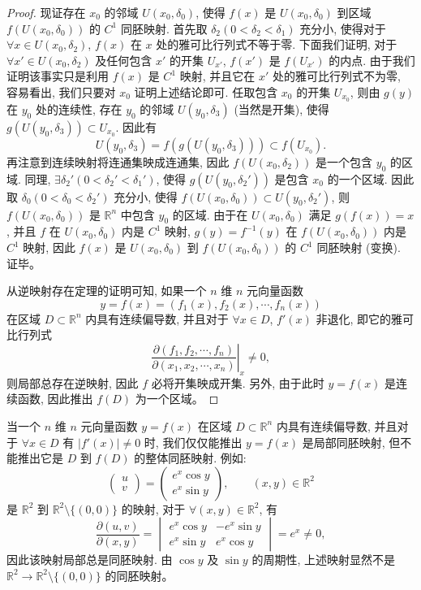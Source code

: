 \documentclass[12pt,fontset=fandol]{ctexart}
\begin{document}
\begin{proof}
现证存在 $x_0$ 的邻域 $U(x_0,\delta_0)$, 使得 $f(x)$ 是 $U(x_0,\delta_0)$ 到区域 $f(U(x_0,\delta_0))$ 的 $C^1$ 同胚映射. 首先取 $\delta_2(0<\delta_2<\delta_1)$ 充分小, 使得对于 $\forall x\in U(x_0,\delta_2)$, $f(x)$ 在 $x$ 处的雅可比行列式不等于零. 下面我们证明, 对于 $\forall x'\in U(x_0,\delta_2)$ 及任何包含 $x'$ 的开集 $U_{x'}$, $f(x')$ 是 $f(U_{x'})$ 的内点. 由于我们证明该事实只是利用 $f(x)$ 是 $C^1$ 映射, 并且它在 $x'$ 处的雅可比行列式不为零, 容易看出, 我们只要对 $x_0$ 证明上述结论即可. 任取包含 $x_0$ 的开集 $U_{x_0}$, 则由 $g(y)$ 在 $y_0$ 处的连续性, 存在 $y_0$ 的邻域 $U(y_0,\delta_3)$ (当然是开集), 使得 $g(U(y_0,\delta_3))\subset U_{x_0}$. 因此有
\[
  U(y_0,\delta_3)=f(g(U(y_0,\delta_3)))\subset f(U_{x_0}).
\]
再注意到连续映射将连通集映成连通集, 因此 $f(U(x_0,\delta_2))$ 是一个包含 $y_0$ 的区域. 同理, $\exists\delta_2'(0<\delta_2'<\delta_1')$, 使得 $g(U(y_0,\delta_2'))$ 是包含 $x_0$ 的一个区域. 因此取 $\delta_0(0<\delta_0<\delta_2')$ 充分小, 使得 $f(U(x_0,\delta_0))\subset U(y_0,\delta_2')$, 则 $f(U(x_0,\delta_0))$ 是 $\mathbb R^n$ 中包含 $y_0$ 的区域. 由于在 $U(x_0,\delta_0)$ 满足 $g(f(x))=x$, 并且 $f$ 在 $U(x_0,\delta_0)$ 内是 $C^1$ 映射, $g(y)=f^{-1}(y)$ 在 $f(U(x_0,\delta_0))$ 内是 $C^1$ 映射, 因此 $f(x)$ 是 $U(x_0,\delta_0)$ 到 $f(U(x_0,\delta_0))$ 的 $C^1$ 同胚映射 (变换). 证毕。

从逆映射存在定理的证明可知, 如果一个 $n$ 维 $n$ 元向量函数
\[
  y=f(x)=(f_1(x),f_2(x),\cdots,f_n(x))
\]
在区域 $D\subset\mathbb R^n$ 内具有连续偏导数, 并且对于 $\forall x\in D$, $f'(x)$ 非退化, 即它的雅可比行列式
\[
  \left.
  \frac{\partial(f_1,f_2,\cdots,f_n)}
       {\partial(x_1,x_2,\cdots,x_n)}
  \right|_x
  \ne0,
\]
则局部总存在逆映射, 因此 $f$ 必将开集映成开集. 另外, 由于此时 $y=f(x)$ 是连续函数, 因此推出 $f(D)$ 为一个区域。

\end{proof}
\noindent{}\quad 当一个 $n$ 维 $n$ 元向量函数 $y=f(x)$ 在区域 $D\subset\mathbb R^n$ 内具有连续偏导数, 并且对于 $\forall x\in D$ 有 $|f'(x)|\ne0$ 时, 我们仅仅能推出 $y=f(x)$ 是局部同胚映射, 但不能推出它是 $D$ 到 $f(D)$ 的整体同胚映射. 例如:
\[
  \begin{pmatrix}
    u\\
    v
  \end{pmatrix}
  =
  \begin{pmatrix}
    e^x\cos y\\
    e^x\sin y
  \end{pmatrix},
  \qquad (x,y)\in\mathbb R^2
\]
是 $\mathbb R^2$ 到 $\mathbb R^2\setminus\{(0,0)\}$ 的映射, 对于 $\forall(x,y)\in\mathbb R^2$, 有
\[
  \frac{\partial(u,v)}{\partial(x,y)}
  =
  \begin{vmatrix}
    e^x\cos y & -e^x\sin y\\
    e^x\sin y & e^x\cos y
  \end{vmatrix}
  =e^x\ne0,
\]
因此该映射局部总是同胚映射. 由 $\cos y$ 及 $\sin y$ 的周期性, 上述映射显然不是 $\mathbb R^2\to\mathbb R^2\setminus\{(0,0)\}$ 的同胚映射。
\end{document}
